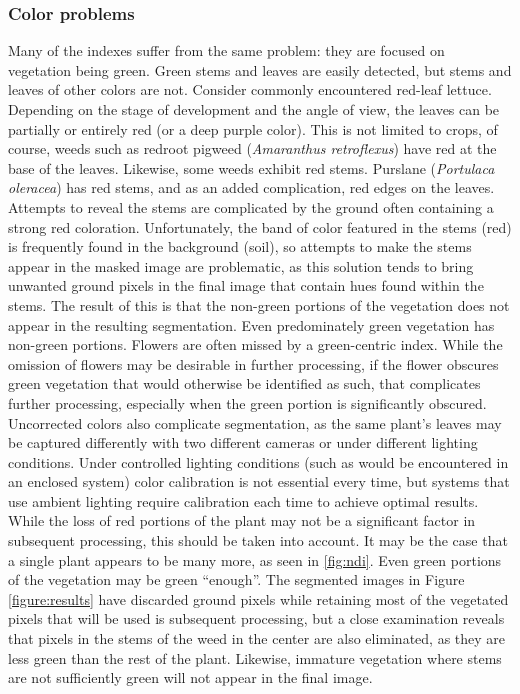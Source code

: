 \documentclass[letterpaper]{article}
\begin{document}
{{\subsubsection{Color problems}
\label{section:problems-color}
Many of the indexes suffer from the same problem: they are focused on vegetation being green. Green stems and leaves are easily detected, but stems and leaves of other colors are not. Consider commonly encountered red-leaf lettuce. Depending on the stage of development and the angle of view, the leaves can be partially or entirely red (or a deep purple color). This is not limited to crops, of course, weeds such as redroot pigweed (\textit{Amaranthus retroflexus}) have red at the base of the leaves. Likewise, some weeds exhibit red stems. Purslane (\textit{Portulaca oleracea}) has red stems, and as an added complication, red edges on the leaves. Attempts to reveal the stems are complicated by the ground often containing a strong red coloration. Unfortunately, the band of color featured in the stems (red) is frequently found in the background (soil), so attempts to make the stems appear in the masked image are problematic, as this solution tends to bring unwanted ground pixels in the final image that contain hues found within the stems. The result of this is that the non-green portions of the vegetation does not appear in the resulting segmentation.  Even predominately green vegetation has non-green portions. Flowers are often missed by a green-centric index. While the omission of flowers may be desirable in further processing, if the flower obscures green vegetation that would otherwise be identified as such, that complicates further processing, especially when the green portion is significantly obscured. Uncorrected colors also complicate segmentation, as the same plant's leaves may be captured differently with two different cameras or under different lighting conditions. Under controlled lighting conditions (such as would be encountered in an enclosed system) color calibration is not essential every time, but systems that use ambient lighting require calibration each time to achieve optimal results. While the loss of red portions of the plant may not be a significant factor in subsequent processing, this should be taken into account. It may be the case that a single plant appears to be many more, as seen in \ref{fig:ndi}.
Even green portions of the vegetation may be green ``enough''. The segmented images in Figure \ref{figure:results} have discarded ground pixels while retaining most of the vegetated pixels that will be used is subsequent processing, but a close examination reveals that pixels in the stems of the weed in the center are also eliminated, as they are less green than the rest of the plant. Likewise, immature vegetation where stems are not sufficiently green will not appear in the final image.


}}
\end{document}
